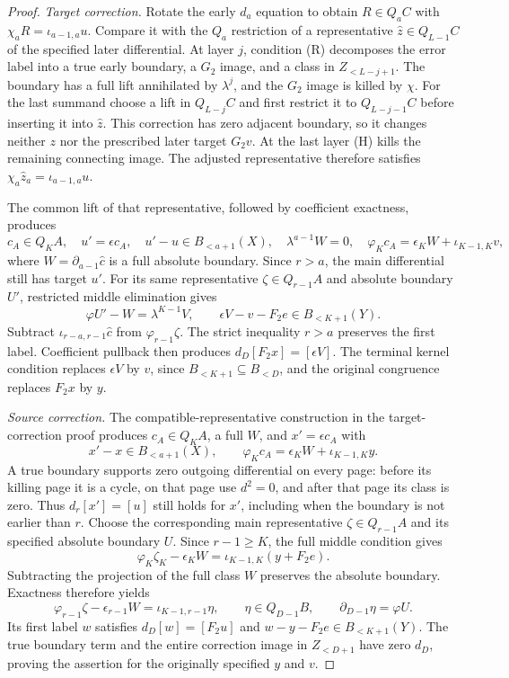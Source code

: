 \begin{proof}
\textit{Target correction.}
Rotate the early $d_a$ equation to obtain $R\in Q_aC$ with
$\chi_aR=\iota_{a-1,a}u$. Compare it with the $Q_a$ restriction of
a representative $\widehat z\in Q_{L-1}C$ of the specified later
differential. At layer $j$, condition (R) decomposes the error label
into a true early boundary, a $G_2$ image, and a class in
$Z_{<L-j+1}$. The boundary has a full lift annihilated by
$\lambda^j$, and the $G_2$ image is killed by $\chi$.
For the last summand choose a lift in $Q_{L-j}C$ and first restrict
it to $Q_{L-j-1}C$ before inserting it into $\widehat z$.
This correction has zero adjacent boundary, so it changes neither
$z$ nor the prescribed later target $G_2v$. At the last layer (H)
kills the remaining connecting image. The adjusted representative
therefore satisfies $\chi_a\widehat z_a=\iota_{a-1,a}u$.

The common lift of that representative, followed by coefficient
exactness, produces
\[
c_A\in Q_KA,\quad u'=\epsilon c_A,\quad
u'-u\in B_{<a+1}(X),\quad \lambda^{a-1}W=0,\quad
\varphi_Kc_A=\epsilon_KW+\iota_{K-1,K}v,
\]
where $W=\partial_{a-1}\widehat c$ is a full absolute boundary.
Since $r>a$, the main differential still has target $u'$.
For its same representative $\zeta\in Q_{r-1}A$ and absolute
boundary $U'$, restricted middle elimination gives
\[
\varphi U'-W=\lambda^{K-1}V,\qquad
\epsilon V-v-F_2e\in B_{<K+1}(Y).
\]
Subtract $\iota_{r-a,r-1}\widehat c$ from
$\varphi_{r-1}\zeta$. The strict inequality $r>a$ preserves the
first label. Coefficient pullback then produces
$d_D[F_2x]=[\epsilon V]$. The terminal kernel condition replaces
$\epsilon V$ by $v$, since $B_{<K+1}\subseteq B_{<D}$, and the
original congruence replaces $F_2x$ by $y$.

\textit{Source correction.}
The compatible-representative construction in the target-correction proof
produces $c_A\in Q_KA$, a full $W$, and $x'=\epsilon c_A$ with
\[
x'-x\in B_{<a+1}(X),\qquad
\varphi_Kc_A=\epsilon_KW+\iota_{K-1,K}y.
\]
A true boundary supports zero outgoing differential on every page:
before its killing page it is a cycle, on that page use $d^2=0$,
and after that page its class is zero. Thus $d_r[x']=[u]$ still
holds for $x'$, including when the boundary is not earlier than $r$.
Choose the corresponding main representative $\zeta\in Q_{r-1}A$
and its specified absolute boundary $U$. Since $r-1\ge K$, the
full middle condition gives
\[
\varphi_K\zeta_K-\epsilon_KW=\iota_{K-1,K}(y+F_2e).
\]
Subtracting the projection of the full class $W$ preserves
the absolute boundary. Exactness therefore yields
\[
\varphi_{r-1}\zeta-\epsilon_{r-1}W
 =\iota_{K-1,r-1}\eta,\qquad
\eta\in Q_{D-1}B,\qquad \partial_{D-1}\eta=\varphi U.
\]
Its first label $w$ satisfies $d_D[w]=[F_2u]$ and
$w-y-F_2e\in B_{<K+1}(Y)$. The true boundary term and the entire
correction image in $Z_{<D+1}$ have zero $d_D$, proving the
assertion for the originally specified $y$ and $v$.


\end{proof}
